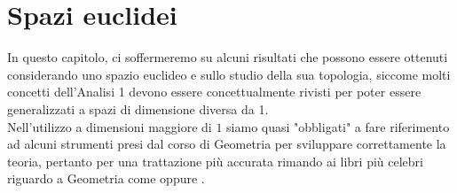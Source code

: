 \chapter{Spazi euclidei}
	In questo capitolo, ci soffermeremo su alcuni risultati che possono essere ottenuti considerando uno spazio euclideo e sullo studio della sua topologia, siccome molti concetti dell'Analisi 1 devono essere concettualmente rivisti per poter essere generalizzati a spazi di dimensione diversa da 1. \\
	Nell'utilizzo a dimensioni maggiore di $1$ siamo quasi "obbligati" a fare riferimento ad alcuni strumenti presi dal corso di Geometria per sviluppare correttamente la teoria, pertanto per una trattazione più accurata rimando ai libri più celebri riguardo a Geometria come \cite{lang} oppure \cite{sernesi}.
	
